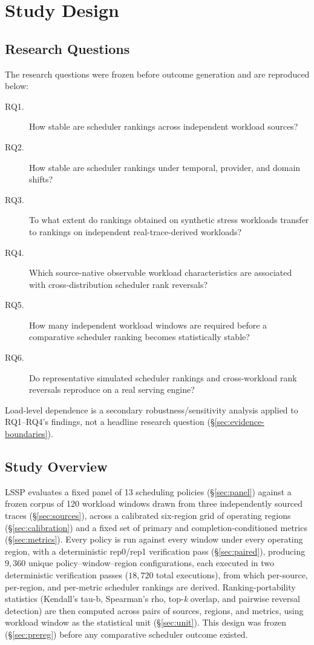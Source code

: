 \section{Study Design}
\label{sec:study-design}

\subsection{Research Questions}
\label{sec:rq}

The research questions were frozen before outcome generation and are reproduced below:

\begin{description}
  \item[RQ1.] How stable are scheduler rankings across independent
    workload sources?
  \item[RQ2.] How stable are scheduler rankings under temporal, provider,
    and domain shifts?
  \item[RQ3.] To what extent do rankings obtained on synthetic stress
    workloads transfer to rankings on independent real-trace-derived
    workloads?
  \item[RQ4.] Which source-native observable workload characteristics are
    associated with cross-distribution scheduler rank reversals?
  \item[RQ5.] How many independent workload windows are required before a
    comparative scheduler ranking becomes statistically stable?
  \item[RQ6.] Do representative simulated scheduler rankings and
    cross-workload rank reversals reproduce on a real serving engine?
\end{description}

Load-level dependence is a secondary robustness/sensitivity analysis applied
to RQ1--RQ4's findings, not a headline research question
(\S\ref{sec:evidence-boundaries}).

\subsection{Study Overview}
\label{sec:overview}

LSSP evaluates a fixed panel of 13 scheduling policies (\S\ref{sec:panel})
against a frozen corpus of 120 workload windows drawn from three
independently sourced traces (\S\ref{sec:sources}), across a calibrated
six-region grid of operating regions (\S\ref{sec:calibration}) and a fixed
set of primary and completion-conditioned metrics (\S\ref{sec:metrics}).
Every policy is run against every window under every operating region,
with a deterministic rep0/rep1 verification pass (\S\ref{sec:paired}),
producing $9{,}360$ unique policy--window--region configurations, each executed in two deterministic verification passes ($18{,}720$ total executions), from which per-source, per-region, and
per-metric scheduler rankings are derived. Ranking-portability statistics (Kendall's tau-b, Spearman's
rho, top-\emph{k} overlap, and pairwise reversal detection) are then
computed across pairs of sources, regions, and metrics, using workload
window as the statistical unit (\S\ref{sec:unit}). This design was frozen
(\S\ref{sec:prereg}) before any comparative scheduler outcome existed.

